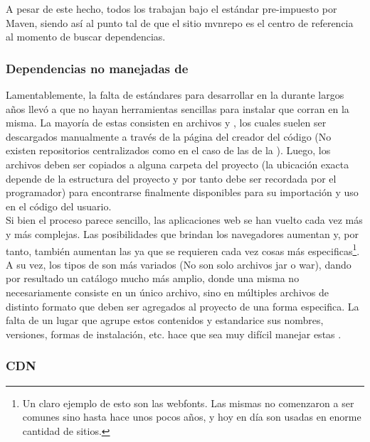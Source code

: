 A pesar de este hecho, todos los \depmgrs trabajan bajo el
estándar pre-impuesto por Maven, siendo así al punto tal de que el sitio
\gls{mvnrepo} es el centro de referencia al momento de buscar dependencias.

\subsubsection{Dependencias no manejadas de \viewtier}
\label{susubbsec:intro:jvm_dev:view_dependencies}

Lamentablemente, la falta de estándares para desarrollar \rias en la \viewtier 
durante largos años
llevó a que no hayan herramientas sencillas para instalar \dependencies que
corran en la misma. La mayoría de estas \dependencies consisten en archivos
\css y \js, los cuales suelen ser descargados manualmente a través de la
página del creador del código (No existen repositorios centralizados como
en el caso de las \dependencies de la \logictier). Luego, los archivos deben
ser copiados a alguna carpeta del proyecto (la ubicación exacta depende de
la estructura del proyecto y por tanto debe ser recordada por el programador)
para encontrarse finalmente disponibles para su importación y uso en el código
del usuario.\\
Si bien el proceso parece sencillo, las aplicaciones web se han vuelto cada
vez más y más complejas. Las posibilidades que brindan los navegadores aumentan
y, por tanto, también aumentan las \dependencies ya que se requieren cada vez
cosas más especificas\footnote{
	Un claro ejemplo de esto son las \gls{webfonts}. Las mismas
	no comenzaron a ser comunes sino hasta hace unos pocos años, y hoy en día
	son usadas en enorme cantidad de sitios.
}.\\
A su vez, los tipos de \dependency son más variados (No son solo archivos jar o war),
dando por resultado un catálogo mucho más amplio, donde una misma \dependency no
necesariamente consiste en un único archivo, sino en múltiples archivos de distinto
formato que deben ser agregados al proyecto de una forma especifica. La falta de un
lugar que agrupe
estos contenidos y estandarice sus nombres, versiones, formas de instalación, etc. hace que sea muy
difícil manejar estas \dependencies.

\subsubsection{CDN}
\label{susubbsec:intro:jvm_dev:cdns}

